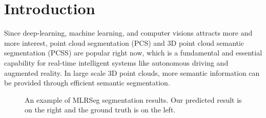\documentclass[final]{cvpr}
\begin{document}
\section{Introduction}
Since deep-learning, machine learning, and computer visions attracts more and more interest, point cloud segmentation (PCS) and 3D point cloud semantic segmentation (PCSS) \cite{2014Features}are popular right now, which is a fundamental and essential capability for real-time intelligent systems like autonomous driving and augmented reality. In large scale 3D point clouds, more semantic information can be provided through efficient semantic segmentation. 
\begin{figure}[h]
	\centering
	\quad
	\quad
	\caption{An example of MLRSeg segmentation results. Our predicted  result  is  on  the  right  and  the  ground  truth  is  on the left. }
\end{figure}
	\label{fig:per}
\end{document}
